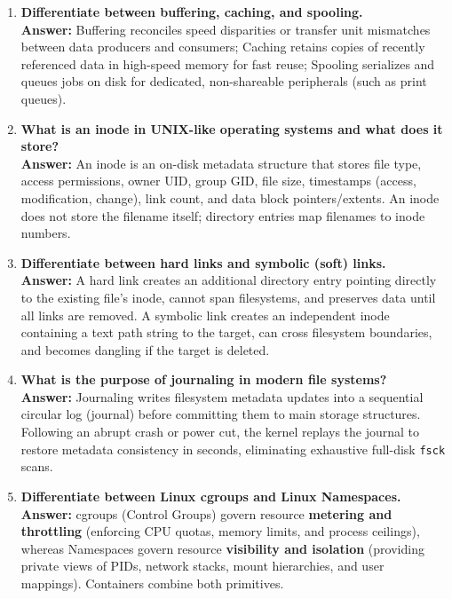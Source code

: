 \begin{enumerate}[label=\textbf{Q\arabic*.},leftmargin=1.2cm]
\item \textbf{Differentiate between buffering, caching, and spooling.} \\
\textbf{Answer:} Buffering reconciles speed disparities or transfer unit mismatches between data producers and consumers; Caching retains copies of recently referenced data in high-speed memory for fast reuse; Spooling serializes and queues jobs on disk for dedicated, non-shareable peripherals (such as print queues).

\item \textbf{What is an inode in UNIX-like operating systems and what does it store?} \\
\textbf{Answer:} An inode is an on-disk metadata structure that stores file type, access permissions, owner UID, group GID, file size, timestamps (access, modification, change), link count, and data block pointers/extents. An inode does not store the filename itself; directory entries map filenames to inode numbers.

\item \textbf{Differentiate between hard links and symbolic (soft) links.} \\
\textbf{Answer:} A hard link creates an additional directory entry pointing directly to the existing file's inode, cannot span filesystems, and preserves data until all links are removed. A symbolic link creates an independent inode containing a text path string to the target, can cross filesystem boundaries, and becomes dangling if the target is deleted.

\item \textbf{What is the purpose of journaling in modern file systems?} \\
\textbf{Answer:} Journaling writes filesystem metadata updates into a sequential circular log (journal) before committing them to main storage structures. Following an abrupt crash or power cut, the kernel replays the journal to restore metadata consistency in seconds, eliminating exhaustive full-disk \texttt{fsck} scans.

\item \textbf{Differentiate between Linux cgroups and Linux Namespaces.} \\
\textbf{Answer:} cgroups (Control Groups) govern resource \textbf{metering and throttling} (enforcing CPU quotas, memory limits, and process ceilings), whereas Namespaces govern resource \textbf{visibility and isolation} (providing private views of PIDs, network stacks, mount hierarchies, and user mappings). Containers combine both primitives.


\end{enumerate}
